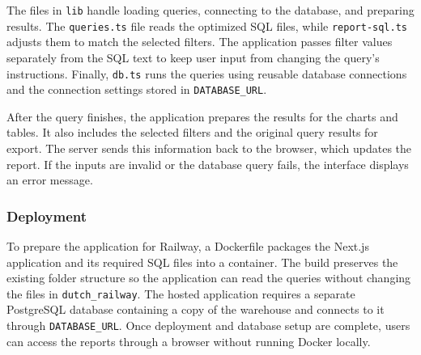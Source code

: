 The files in \texttt{lib} handle loading queries, connecting to the database, and preparing results. The \texttt{queries.ts} file reads the optimized SQL files, while \texttt{report-sql.ts} adjusts them to match the selected filters. The application passes filter values separately from the SQL text to keep user input from changing the query's instructions. Finally, \texttt{db.ts} runs the queries using reusable database connections and the connection settings stored in \texttt{DATABASE\_URL}.

After the query finishes, the application prepares the results for the charts and tables. It also includes the selected filters and the original query results for export. The server sends this information back to the browser, which updates the report. If the inputs are invalid or the database query fails, the interface displays an error message.

\subsubsection{Deployment}
\label{subsubsec:application_deployment}

To prepare the application for Railway, a Dockerfile packages the Next.js application and its required SQL files into a container. The build preserves the existing folder structure so the application can read the queries without changing the files in \texttt{dutch\_railway}. The hosted application requires a separate PostgreSQL database containing a copy of the warehouse and connects to it through \texttt{DATABASE\_URL}. Once deployment and database setup are complete, users can access the reports through a browser without running Docker locally. 
